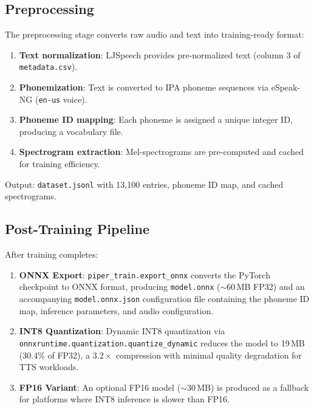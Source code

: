 \documentclass[10pt,a4paper,twocolumn]{article}
\begin{document}
\subsection{Preprocessing}

The preprocessing stage converts raw audio and text into training-ready format:
\begin{enumerate}[nosep]
    \item \textbf{Text normalization}: LJSpeech provides pre-normalized text (column 3 of \texttt{metadata.csv}).
    \item \textbf{Phonemization}: Text is converted to IPA phoneme sequences via eSpeak-NG (\texttt{en-us} voice).
    \item \textbf{Phoneme ID mapping}: Each phoneme is assigned a unique integer ID, producing a vocabulary file.
    \item \textbf{Spectrogram extraction}: Mel-spectrograms are pre-computed and cached for training efficiency.
\end{enumerate}

Output: \texttt{dataset.jsonl} with 13,100 entries, phoneme ID map, and cached spectrograms.

\subsection{Post-Training Pipeline}

After training completes:

\begin{enumerate}
    \item \textbf{ONNX Export}: \texttt{piper\_train.export\_onnx} converts the PyTorch checkpoint to ONNX format, producing \texttt{model.onnx} ($\sim$60\,MB FP32) and an accompanying \texttt{model.onnx.json} configuration file containing the phoneme ID map, inference parameters, and audio configuration.

    \item \textbf{INT8 Quantization}: Dynamic INT8 quantization via \texttt{onnxruntime.quantization.quantize\_dynamic} reduces the model to 19\,MB (30.4\% of FP32), a $3.2\times$ compression with minimal quality degradation for TTS workloads.

    \item \textbf{FP16 Variant}: An optional FP16 model ($\sim$30\,MB) is produced as a fallback for platforms where INT8 inference is slower than FP16.
\end{enumerate}

\end{document}
